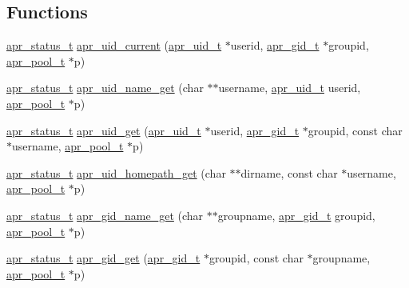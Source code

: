 \subsection*{Functions}
\begin{DoxyCompactItemize}
\item 
\hyperlink{group__apr__errno_gaf76ee4543247e9fb3f3546203e590a6c}{apr\-\_\-status\-\_\-t} \hyperlink{group__apr__user_ga6583c5814fcf3924a2e391dac126f8a9}{apr\-\_\-uid\-\_\-current} (\hyperlink{group__apr__user_gad1aa508f584bc230acf4f68ba4fc4de7}{apr\-\_\-uid\-\_\-t} $\ast$userid, \hyperlink{group__apr__user_ga22e9e224e984f837f3e276833e2f3a55}{apr\-\_\-gid\-\_\-t} $\ast$groupid, \hyperlink{group__apr__pools_gaf137f28edcf9a086cd6bc36c20d7cdfb}{apr\-\_\-pool\-\_\-t} $\ast$p)
\item 
\hyperlink{group__apr__errno_gaf76ee4543247e9fb3f3546203e590a6c}{apr\-\_\-status\-\_\-t} \hyperlink{group__apr__user_gad56be7519e060a3c6698657f51ab6bc8}{apr\-\_\-uid\-\_\-name\-\_\-get} (char $\ast$$\ast$username, \hyperlink{group__apr__user_gad1aa508f584bc230acf4f68ba4fc4de7}{apr\-\_\-uid\-\_\-t} userid, \hyperlink{group__apr__pools_gaf137f28edcf9a086cd6bc36c20d7cdfb}{apr\-\_\-pool\-\_\-t} $\ast$p)
\item 
\hyperlink{group__apr__errno_gaf76ee4543247e9fb3f3546203e590a6c}{apr\-\_\-status\-\_\-t} \hyperlink{group__apr__user_ga4b82187f32db9350f2e02165bbce965b}{apr\-\_\-uid\-\_\-get} (\hyperlink{group__apr__user_gad1aa508f584bc230acf4f68ba4fc4de7}{apr\-\_\-uid\-\_\-t} $\ast$userid, \hyperlink{group__apr__user_ga22e9e224e984f837f3e276833e2f3a55}{apr\-\_\-gid\-\_\-t} $\ast$groupid, const char $\ast$username, \hyperlink{group__apr__pools_gaf137f28edcf9a086cd6bc36c20d7cdfb}{apr\-\_\-pool\-\_\-t} $\ast$p)
\item 
\hyperlink{group__apr__errno_gaf76ee4543247e9fb3f3546203e590a6c}{apr\-\_\-status\-\_\-t} \hyperlink{group__apr__user_ga0ad8087cf1c6257a286cf5215da8107e}{apr\-\_\-uid\-\_\-homepath\-\_\-get} (char $\ast$$\ast$dirname, const char $\ast$username, \hyperlink{group__apr__pools_gaf137f28edcf9a086cd6bc36c20d7cdfb}{apr\-\_\-pool\-\_\-t} $\ast$p)
\item 
\hyperlink{group__apr__errno_gaf76ee4543247e9fb3f3546203e590a6c}{apr\-\_\-status\-\_\-t} \hyperlink{group__apr__user_gadda2c777f2e8d61c02be34305720e316}{apr\-\_\-gid\-\_\-name\-\_\-get} (char $\ast$$\ast$groupname, \hyperlink{group__apr__user_ga22e9e224e984f837f3e276833e2f3a55}{apr\-\_\-gid\-\_\-t} groupid, \hyperlink{group__apr__pools_gaf137f28edcf9a086cd6bc36c20d7cdfb}{apr\-\_\-pool\-\_\-t} $\ast$p)
\item 
\hyperlink{group__apr__errno_gaf76ee4543247e9fb3f3546203e590a6c}{apr\-\_\-status\-\_\-t} \hyperlink{group__apr__user_gac65178a647d34387781dc8d7ade3cefc}{apr\-\_\-gid\-\_\-get} (\hyperlink{group__apr__user_ga22e9e224e984f837f3e276833e2f3a55}{apr\-\_\-gid\-\_\-t} $\ast$groupid, const char $\ast$groupname, \hyperlink{group__apr__pools_gaf137f28edcf9a086cd6bc36c20d7cdfb}{apr\-\_\-pool\-\_\-t} $\ast$p)
\end{DoxyCompactItemize}


